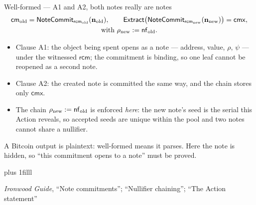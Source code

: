 \documentclass[aspectratio=169,11pt]{beamer}
\newcommand{\cmsym}{\ensuremath{\mathsf{cm}}}
\newcommand{\cmx}{\ensuremath{\mathsf{cmx}}}
\newcommand{\rcm}{\ensuremath{\mathsf{rcm}}}
\newcommand{\Extract}{\ensuremath{\mathsf{Extract}}}
\newcommand{\NoteCommit}{\ensuremath{\mathsf{NoteCommit}}}
\newcommand{\src}[1]{\par\vskip0pt plus 1filll
  {\fontsize{6}{7.2}\selectfont\color{arbdim}\raggedright #1\par}}
\begin{document}
\begin{frame}{Well-formed --- A1 and A2, both notes really are notes}
\begin{gather*}
\Eold{\cmsym} = \NoteCommit_{\Eold{\rcm}}(\mathbf{n}_{\mathrm{old}}),
\qquad
\Extract\bigl(\NoteCommit_{\Enew{\rcm}}(\mathbf{n}_{\mathrm{new}})\bigr)
= \cmx, \\
\text{with } \Enew{\rho} := \Enf .
\end{gather*}
\begin{itemize}
  \item Clause A1: the object being spent opens as a note --- address,
    value, $\rho$, $\psi$ --- under the witnessed $\rcm$; the commitment is
    binding, so one leaf cannot be reopened as a second note.
  \item Clause A2: the created note is committed the same way, and the
    chain stores only $\cmx$.
  \item The chain $\rho_{\mathrm{new}} := \mathsf{nf}_{\mathrm{old}}$ is enforced \emph{here}: the new
    note's seed is the serial this Action reveals, so accepted seeds
    are unique within the pool and two notes cannot share a nullifier.
\end{itemize}
\medskip
\small A Bitcoin output is plaintext: well-formed means it parses.
Here the note is hidden, so ``this commitment opens to a note'' must be
proved.
\src{\emph{Ironwood Guide}, ``Note commitments''; ``Nullifier chaining''; ``The
  Action statement''}
\end{frame}
\end{document}
